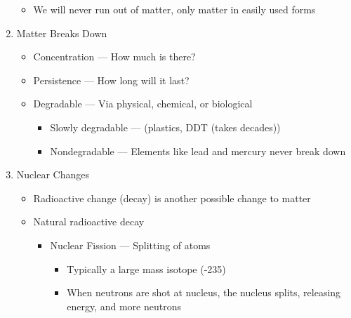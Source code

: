 \documentclass[12pt]{article}
\begin{document}
\begin{enumerate}
\begin{itemize}
      \item We will never run out of matter, only matter in easily used forms

    \end{itemize}

  \item Matter Breaks Down

    \begin{itemize}

      \item Concentration — How much is there?

      \item Persistence — How long will it last?

      \item Degradable — Via physical, chemical, or biological

        \begin{itemize}

          \item Slowly degradable — (plastics, DDT (takes decades))

          \item Nondegradable — Elements like lead and mercury never break down

        \end{itemize}

    \end{itemize}

  \item Nuclear Changes

    \begin{itemize}

      \item Radioactive change (decay) is another possible change to matter

      \item Natural radioactive decay

        \begin{itemize}

          \item Nuclear Fission — Splitting of atoms

            \begin{itemize}

              \item Typically a large mass isotope (-235)

              \item When neutrons are shot at nucleus, the nucleus splits, releasing energy, and more neutrons


\end{itemize}
\end{itemize}
\end{itemize}
\end{enumerate}
\end{document}
